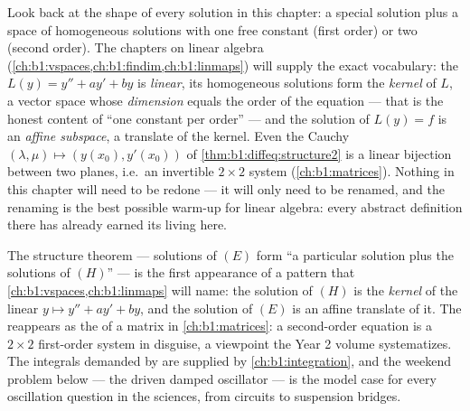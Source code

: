 \begin{remark}\label{rem:b1:diffeq:interlude}
Look back at the shape of every solution  in this chapter: a
special solution plus a space of homogeneous solutions with one
free constant (first order) or two (second order). The chapters on
linear algebra (\cref{ch:b1:vspaces,ch:b1:findim,ch:b1:linmaps})
will supply the exact
vocabulary: the  $L(y) = y'' + ay' + by$ is \emph{linear}, its
homogeneous solutions form the \emph{kernel} of $L$, a vector
space whose \emph{dimension} equals the order of the equation ---
that is the honest content of ``one constant per order'' --- and
the solution  of $L(y) = f$ is an \emph{affine subspace}, a
translate of the kernel. Even the Cauchy  $(\lambda, \mu)
\mapsto (y(x_0), y'(x_0))$ of \cref{thm:b1:diffeq:structure2} is a
linear bijection between two planes, i.e.\ an invertible $2
\times 2$ system (\cref{ch:b1:matrices}). Nothing in this chapter
will need to be redone --- it will only need to be renamed, and
the renaming is the best possible warm-up for linear algebra:
every abstract definition there has already earned its living
here.
\end{remark}

\begin{remark}\label{rem:b1:diffeq:whereused}
The structure theorem --- solutions of $(E)$ form ``a particular
solution plus the solutions of $(H)$'' --- is the first appearance
of a pattern that \cref{ch:b1:vspaces,ch:b1:linmaps} will name: the
solution  of $(H)$ is the \emph{kernel} of the linear  $y
\mapsto y'' + ay' + by$, and the solution  of $(E)$ is an
affine translate of it. The  reappears as
the  of a matrix in \cref{ch:b1:matrices}:
a second-order equation is a $2 \times 2$ first-order system in
disguise, a viewpoint the Year 2 volume systematizes. The
integrals demanded by  are supplied by
\cref{ch:b1:integration}, and the weekend problem below --- the
driven damped oscillator --- is the model case for every
oscillation question in the sciences, from circuits to suspension
bridges.
\end{remark}


